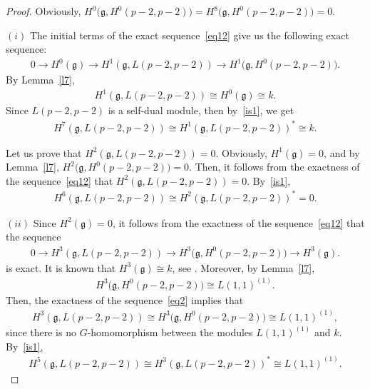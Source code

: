 \documentclass[pdftex]{sigma}%
\numberwithin{equation}{section}
\begin{document}
\begin{proof} Obviously, $H^0\big(\mathfrak{g},H^0(p-2,p-2)\big)=H^8\big(\mathfrak{g},H^0(p-2,p-2)\big)=0$.

$(i)$ The initial terms of the exact sequence~\eqref{eq12} give us the following exact sequence:
\begin{gather*}0\longrightarrow H^0(\mathfrak{g})\longrightarrow H^1(\mathfrak{g},L(p-2,p-2))\longrightarrow H^1\big(\mathfrak{g},H^0(p-2,p-2)\big).\end{gather*} By Lemma~\ref{l7},
\begin{gather*}H^1(\mathfrak{g},L(p-2,p-2))\cong H^0(\mathfrak{g})\cong k.\end{gather*}
Since $L(p-2,p-2)$ is a self-dual module, then by~\eqref{is1}, we get
\begin{gather*}H^7(\mathfrak{g},L(p-2,p-2))\cong H^1(\mathfrak{g},L(p-2,p-2))^*\cong k.
\end{gather*}

Let us prove that $H^2(\mathfrak{g},L(p-2,p-2))=0$. Obviously, $H^1(\mathfrak{g})=0$, and by Lemma~\ref{l7}, $H^2\big(\mathfrak{g},H^0(p-2,p-2)\big)=0$. Then, it follows from the exactness of the sequence~\eqref{eq12} that $H^2(\mathfrak{g},L(p-2,p-2))=0$. By~\eqref{is1},
\begin{gather*}H^6(\mathfrak{g},L(p-2,p-2))\cong H^2(\mathfrak{g},L(p-2,p-2))^*=0.\end{gather*}

$(ii)$ Since $H^2(\mathfrak{g})=0$, it follows from the exactness of the sequence~\eqref{eq12} that the sequence
\begin{gather} 0\longrightarrow H^3(\mathfrak{g},L(p-2,p-2))\longrightarrow H^3\big(\mathfrak{g},H^0(p-2,p-2)\big)\longrightarrow H^3(\mathfrak{g}).\label{eq2}
\end{gather}
is exact. It is known that $H^3(\mathfrak{g})\cong k$, see \cite[p.~113]{CheE48}. Moreover, by Lemma~\ref{l7},
\begin{gather*}
H^3\big(\mathfrak{g},H^0(p-2,p-2)\big)\cong L(1,1)^{(1)}.
\end{gather*}
Then, the exactness of the sequence~\eqref{eq2} implies that
\begin{gather*}
H^3(\mathfrak{g},L(p-2,p-2))\cong H^3\big(\mathfrak{g},H^0(p-2,p-2)\big)\cong L(1,1)^{(1)},
\end{gather*}
since there is no $G$-homomorphism between the modules $L(1,1)^{(1)}$ and $k$. By~\eqref{is1},
\begin{gather*}H^5(\mathfrak{g},L(p-2,p-2))\cong H^3(\mathfrak{g},L(p-2,p-2))^*\cong L(1,1)^{(1)}.
\end{gather*}


\end{proof}
\end{document}
